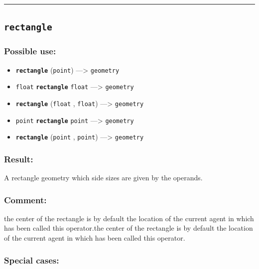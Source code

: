 \documentclass[]{book}
\providecommand{\tightlist}{%
  \setlength{\itemsep}{0pt}\setlength{\parskip}{0pt}}
\theoremstyle{definition}
\theoremstyle{definition}
\theoremstyle{definition}
\theoremstyle{remark}
\begin{document}
\begin{center}\rule{0.5\linewidth}{\linethickness}\end{center}

\subsection{\texorpdfstring{\texttt{rectangle}}{rectangle}}\label{rectangle}

\subsubsection{Possible use:}\label{possible-use-430}

\begin{itemize}
\tightlist
\item
  \textbf{\texttt{rectangle}} (\texttt{point}) ---\textgreater{}
  \texttt{geometry}
\item
  \texttt{float} \textbf{\texttt{rectangle}} \texttt{float}
  ---\textgreater{} \texttt{geometry}
\item
  \textbf{\texttt{rectangle}} (\texttt{float} , \texttt{float})
  ---\textgreater{} \texttt{geometry}
\item
  \texttt{point} \textbf{\texttt{rectangle}} \texttt{point}
  ---\textgreater{} \texttt{geometry}
\item
  \textbf{\texttt{rectangle}} (\texttt{point} , \texttt{point})
  ---\textgreater{} \texttt{geometry}
\end{itemize}

\subsubsection{Result:}\label{result-416}

A rectangle geometry which side sizes are given by the operands.

\subsubsection{Comment:}\label{comment-81}

the center of the rectangle is by default the location of the current
agent in which has been called this operator.the center of the rectangle
is by default the location of the current agent in which has been called
this operator.

\subsubsection{Special cases:}\label{special-cases-116}
\end{document}
